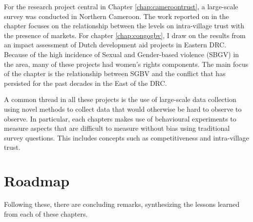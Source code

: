 For the research project central in Chapter \ref{chap:cameroontrust}, a large-scale survey was conducted in Northern Cameroon. The work reported on in the chapter focuses on the relationship between the levels on intra-village trust with the presence of markets. For chapter \ref{chap:congogbv}, I draw on the results from an impact assessment of Dutch development aid projects in Eastern DRC. Because of the high incidence of Sexual and Gender-based violence (SBGV) in the area, many of these projects had women's rights components. The main focus of the chapter is the relationship between SGBV and the conflict that has persisted for the past decades in the East of the DRC. 

A common thread in all these projects is the use of large-scale data collection using novel methods to collect data that would otherwise be hard to observe to observe. In particular, each chapters makes  use of behavioural experiments to measure aspects that are difficult to measure without bias using traditional survey questions. This includes concepts such as competitiveness and intra-village trust.

\section{Roadmap}
Following these, there are concluding remarks, synthesizing the lessons learned from each of these chapters.

\clearpage 

